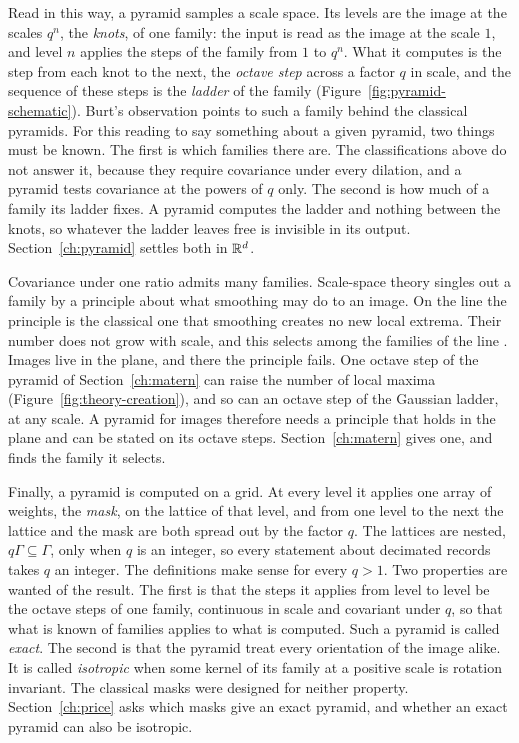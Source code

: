 Read in this way, a pyramid samples a scale space. Its levels are the image at the scales $q^n$,
the \emph{knots}, of one family: the input is read as the image at the scale $1$, and level $n$
applies the steps of the family from $1$ to $q^n$. What it computes is the step from each knot to the next, the
\emph{octave step} across a factor $q$ in scale, and the sequence of these steps is the
\emph{ladder} of the family (Figure~\ref{fig:pyramid-schematic}). Burt's observation points to such a
family behind the classical pyramids. For this reading to say something about a given pyramid, two
things must be known. The first is which families there are. The classifications above do not
answer it, because they require covariance under every dilation, and a pyramid tests covariance at
the powers of $q$ only. The second is how much of a family its ladder fixes. A pyramid computes the
ladder and nothing between the knots, so whatever the ladder leaves free is invisible in its output.
Section~\ref{ch:pyramid} settles both in $\mathbb{R}^d$.

Covariance under one ratio admits many families. Scale-space theory singles out a family by a
principle about what smoothing may do to an image. On the line the principle is the classical one
that smoothing creates no new local extrema. Their number does not grow with scale, and this
selects among the families of the line . Images live in the plane, and
there the principle fails. One octave step of the pyramid of Section~\ref{ch:matern} can raise the number
of local maxima (Figure~\ref{fig:theory-creation}), and so can an octave step of the Gaussian
ladder, at any scale. A pyramid for images
therefore needs a principle that holds in the plane and can be stated on its octave steps.
Section~\ref{ch:matern} gives one, and finds the family it selects.

Finally, a pyramid is computed on a grid. At every level it applies one array of weights, the
\emph{mask}, on the lattice of that level, and from one level to the next the lattice and the mask
are both spread out by the factor $q$. The lattices are nested, $q\Gamma \subseteq \Gamma$, only
when $q$ is an integer, so every statement about decimated records takes $q$ an integer. The
definitions make sense for every $q > 1$. Two properties are wanted of the result. The first is that
the steps it applies from level to level be the octave steps of one family, continuous in scale and
covariant under $q$, so that what is known of families applies to what is computed. Such a pyramid
is called \emph{exact}. The second is that the
pyramid treat every orientation of the image alike. It is called \emph{isotropic} when some kernel of
its family at a positive scale is rotation invariant. The classical masks were designed for neither
property. Section~\ref{ch:price} asks which masks give an exact pyramid, and whether an exact pyramid
can also be isotropic.

